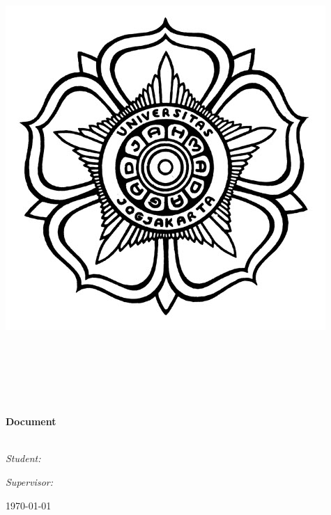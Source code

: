 \begin{center}
\includegraphics[scale=.7]{logougm} \\ [.2cm]
\textsc{\LARGE \@university} \\ 
\textsc{\Large \@faculty} \\ 
\textsc{\large \@dept} \\
\textsc{\large \@city} \\ [2.5cm] 	%
	\textsc{\Large \@titleind}		\\ [2cm]	%

	\HRule	\\
	[0.4cm]
	{\huge\bfseries Document \@program}	\\
	[0.4cm]
	\HRule 	\\
	[2cm]
	
	\begin{minipage}{0.35\textwidth}
	\begin{flushleft} \large
		\emph{Student:}	\\
		\@fullname
	\end{flushleft}
	\end{minipage}		
	\begin{minipage}{0.55\textwidth}
	\begin{flushright} \large
		\emph{Supervisor:}	\\
		\@firstsupervisor
	\end{flushright}
	\end{minipage}
	
	\vfill
	
	{\large \today}
\end{center}

